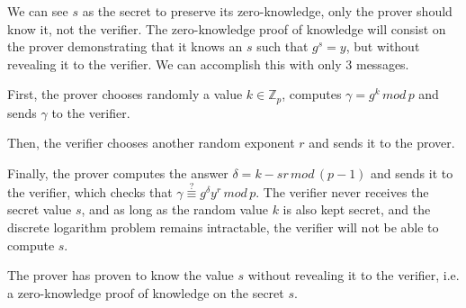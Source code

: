 We can see $s$ as the secret to preserve its zero-knowledge, only the prover should know it, not the verifier. The zero-knowledge proof of knowledge will consist on the prover demonstrating that it knows an $s$ such that $g^s = y$, but without revealing it to the verifier. We can accomplish this with only 3 messages.

First, the prover chooses randomly a value $k \in \mathbb{Z}_p$, computes $\gamma = g^k\, mod\, p$ and sends $\gamma$ to the verifier.

Then, the verifier chooses another random exponent $r$ and sends it to the prover.

Finally, the prover computes the answer $\delta=k-sr \, mod\, (p-1)$ and sends it to the verifier, which checks that $\gamma \overset{?}{\equiv} g^{\delta} y^r \, mod \, p$. The verifier never receives the secret value $s$, and as long as the random value $k$ is also kept secret, and the discrete logarithm problem remains intractable, the verifier will not be able to compute $s$.

The prover has proven to know the value $s$ without revealing it to the verifier, i.e. a zero-knowledge proof of knowledge on the secret $s$.
